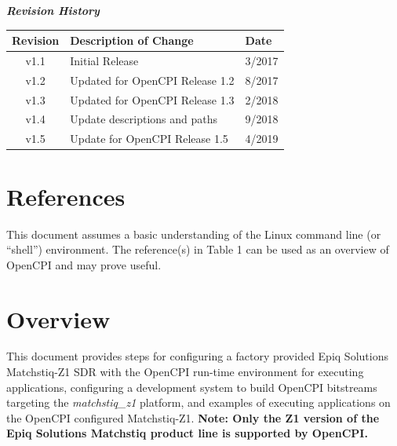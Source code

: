 	\begin{center}
	\textit{\textbf{Revision History}}
		\begin{table}[H]
		\label{table:revisions} %
			\begin{tabularx}{\textwidth}{|c|X|l|}
			\hline
			\rowcolor{blue}
			\textbf{Revision} & \textbf{Description of Change} & \textbf{Date} \\
		    \hline
            v1.1 & Initial Release & 3/2017 \\
            \hline
            v1.2 & Updated for OpenCPI Release 1.2 & 8/2017 \\
            \hline
            v1.3 & Updated for OpenCPI Release 1.3 & 2/2018 \\
            \hline
            v1.4 & Update descriptions and paths & 9/2018 \\
            \hline
            v1.5 & Update  for OpenCPI Release 1.5 & 4/2019 \\
            \hline
			\end{tabularx}
		\end{table}
	\end{center}

\newpage

\tableofcontents

\newpage

\section{References}

	This document assumes a basic understanding of the Linux command line (or ``shell'') environment.  The reference(s) in Table 1 can be used as an overview of OpenCPI and may prove useful.
\def\refskipocpiov{}
\def\refcapbottom{}


\newpage
\section{Overview}
This document provides steps for configuring a factory provided Epiq Solutions Matchstiq-Z1 SDR with the OpenCPI run-time environment for executing applications, configuring a development system to build OpenCPI bitstreams targeting the \textit{matchstiq\_z1} platform, and examples of executing applications on the OpenCPI configured Matchstiq-Z1. \textbf{Note: Only the Z1 version of the Epiq Solutions Matchstiq product line is supported by OpenCPI.}

